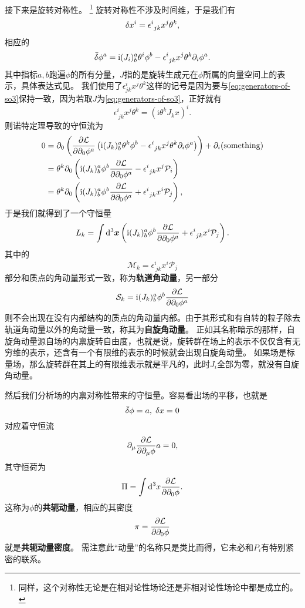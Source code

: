 \documentclass[hyperref, UTF8, a4paper]{ctexart}
\newcommand*{\ii}{\mathrm{i}}
\renewcommand{\autoref}{\prettyref}
\begin{document}
接下来是旋转对称性。%
\footnote{同样，这个对称性无论是在相对论性场论还是非相对论性场论中都是成立的。}%
旋转对称性不涉及时间维，于是我们有
\[
    \var{x^i} = \epsilon^i_{\ jk}  x^j \theta^k,
\]
相应的
\[
    \bar{\var}{\phi^a} = \ii (J_i)^a_b \theta^i \phi^b - \epsilon^i_{\ jk}  x^j \theta^k \partial_i \phi^a.
\]
其中指标$a,b$跑遍$\phi$的所有分量，$J$指的是旋转生成元在$\phi$所属的向量空间上的表示，具体表达式见\autoref{sec:rotation}。
我们使用了$\epsilon^i_{jk}  x^j \theta^k$这样的记号是因为要与\eqref{eq:generators-of-so3}保持一致，因为若取$J$为\eqref{eq:generators-of-so3}，正好就有
\[
    \epsilon^i_{\ jk}  x^j \theta^k = (\ii \theta^k J_k x)^i.
\]
则诺特定理导致的守恒流为
\[
    \begin{aligned}
        0 &= \partial_0 \left( \pdv{\mathcal{L}}{\partial_0 \phi^a} \left( \ii (J_k)^a_b \theta^k \phi^b - \epsilon^i_{\ jk}  x^j \theta^k \partial_i \phi^a \right) \right) + \partial_i (\text{something}) \\
        &= \theta^k \partial_0 \left( \ii (J_k)^a_b \phi^b \pdv{\mathcal{L}}{\partial_0 \phi^a} - \epsilon^i_{\ jk} x^j \mathcal{P}_i \right) \\
        &= \theta^k \partial_0 \left( \ii (J_k)^a_b \phi^b \pdv{\mathcal{L}}{\partial_0 \phi^a} + \epsilon^i_{\ jk} x^i \mathcal{P}_j \right),
    \end{aligned}
\]
于是我们就得到了一个守恒量
\begin{equation}
    L_k = \int \dd[3]{\vb*{x}} \left( \ii (J_k)^a_b \phi^b \pdv{\mathcal{L}}{\partial_0 \phi^a} + \epsilon^i_{\ jk} x^i \mathcal{P}_j \right).
    \label{eq:field-angular-momentum}
\end{equation}
其中的
\begin{equation}
    \mathcal{M}_k = \epsilon^i_{\ jk} x^i \mathcal{P}_j 
\end{equation}
部分和质点的角动量形式一致，称为\textbf{轨道角动量}，另一部分
\begin{equation}
    \mathcal{S}_k = \ii (J_k)^a_b \phi^b \pdv{\mathcal{L}}{\partial_0 \phi^a}
\end{equation}
则不会出现在没有内部结构的质点的角动量内部。由于其形式和有自转的粒子除去轨道角动量以外的角动量一致，称其为\textbf{自旋角动量}。
正如其名称暗示的那样，自旋角动量源自场的内禀旋转自由度，也就是说，旋转群在场上的表示不仅仅含有无穷维的表示，还含有一个有限维的表示的时候就会出现自旋角动量。
如果场是标量场，那么旋转群在其上的有限维表示就是平凡的，此时$J_i$全部为零，就没有自旋角动量。

然后我们分析场的内禀对称性带来的守恒量。容易看出场的平移，也就是
\[
    \bar{\var}{\phi} = a, \; \var{x} = 0
\]
对应着守恒流
\[
    \partial_\mu \pdv{\mathcal{L}}{\partial_\mu \phi } a = 0,
\]
其守恒荷为
\begin{equation}
    \Pi = \int \dd[3]x \pdv{\mathcal{L}}{\partial_0 \phi}.
\end{equation}
这称为$\phi$的\textbf{共轭动量}，相应的其密度
\begin{equation}
    \pi = \pdv{\mathcal{L}}{\partial_0 \phi}
\end{equation}
就是\textbf{共轭动量密度}。
需注意此“动量”的名称只是类比而得，它未必和$P_i$有特别紧密的联系。
\end{document}
